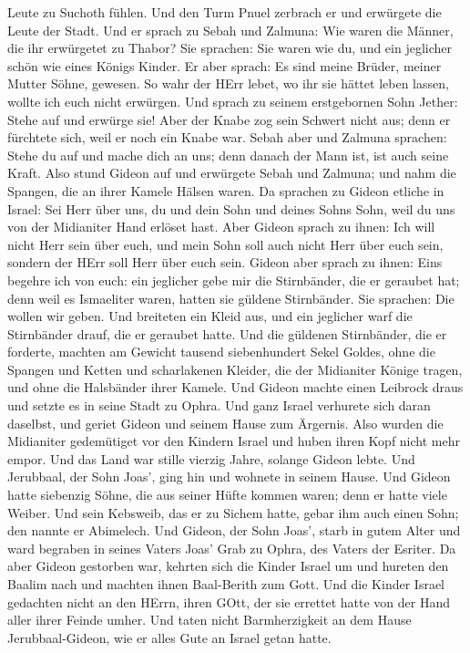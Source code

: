 Leute zu Suchoth fühlen.  Und den Turm Pnuel zerbrach er
und erwürgete die Leute der Stadt.  Und er sprach zu Sebah
und Zalmuna: Wie waren die Männer, die ihr erwürgetet zu Thabor? Sie
sprachen: Sie waren wie du, und ein jeglicher schön wie eines Königs
Kinder.  Er aber sprach: Es sind meine Brüder, meiner
Mutter Söhne, gewesen. So wahr der HErr lebet, wo ihr sie hättet leben
lassen, wollte ich euch nicht erwürgen.  Und sprach zu
seinem erstgebornen Sohn Jether: Stehe auf und erwürge sie! Aber der
Knabe zog sein Schwert nicht aus; denn er fürchtete sich, weil er noch
ein Knabe war.  Sebah aber und Zalmuna sprachen: Stehe du
auf und mache dich an uns; denn danach der Mann ist, ist auch seine
Kraft. Also stund Gideon auf und erwürgete Sebah und Zalmuna; und nahm
die Spangen, die an ihrer Kamele Hälsen waren.  Da sprachen
zu Gideon etliche in Israel: Sei Herr über uns, du und dein Sohn und
deines Sohns Sohn, weil du uns von der Midianiter Hand erlöset hast.
 Aber Gideon sprach zu ihnen: Ich will nicht Herr sein über
euch, und mein Sohn soll auch nicht Herr über euch sein, sondern der
HErr soll Herr über euch sein.  Gideon aber sprach zu
ihnen: Eins begehre ich von euch: ein jeglicher gebe mir die
Stirnbänder, die er geraubet hat; denn weil es Ismaeliter waren, hatten
sie güldene Stirnbänder.  Sie sprachen: Die wollen wir
geben. Und breiteten ein Kleid aus, und ein jeglicher warf die
Stirnbänder drauf, die er geraubet hatte.  Und die güldenen
Stirnbänder, die er forderte, machten am Gewicht tausend siebenhundert
Sekel Goldes, ohne die Spangen und Ketten und scharlakenen Kleider, die
der Midianiter Könige tragen, und ohne die Halsbänder ihrer Kamele.
 Und Gideon machte einen Leibrock draus und setzte es in
seine Stadt zu Ophra. Und ganz Israel verhurete sich daran daselbst, und
geriet Gideon und seinem Hause zum Ärgernis.  Also wurden
die Midianiter gedemütiget vor den Kindern Israel und huben ihren Kopf
nicht mehr empor. Und das Land war stille vierzig Jahre, solange Gideon
lebte.  Und Jerubbaal, der Sohn Joas', ging hin und wohnete
in seinem Hause.  Und Gideon hatte siebenzig Söhne, die aus
seiner Hüfte kommen waren; denn er hatte viele Weiber.  Und
sein Kebsweib, das er zu Sichem hatte, gebar ihm auch einen Sohn; den
nannte er Abimelech.  Und Gideon, der Sohn Joas', starb in
gutem Alter und ward begraben in seines Vaters Joas' Grab zu Ophra, des
Vaters der Esriter.  Da aber Gideon gestorben war, kehrten
sich die Kinder Israel um und hureten den Baalim nach und machten ihnen
Baal-Berith zum Gott.  Und die Kinder Israel gedachten
nicht an den HErrn, ihren GOtt, der sie errettet hatte von der Hand
aller ihrer Feinde umher.  Und taten nicht Barmherzigkeit
an dem Hause Jerubbaal-Gideon, wie er alles Gute an Israel getan hatte.

